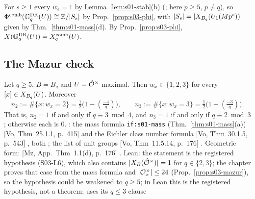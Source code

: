 For $s\ge1$ every $w_e=1$ by Lemma~\ref{lem:s01-stab}(b) (; here $p\ge5$, $p\ne q$), so
$\Phi^{\mathrm{comb}}(\mathbb{G}^{\mathrm{DR}}_q(U))\cong\mathbb{Z}/|S_s|$ by Prop.~\ref{prop:s03-phi}, with $|S_s|=|X_{B_q}(U_1(Mp^s))|$ given by Thm.~\ref{thm:s01-mass}(d). \stproved
By Prop.~\ref{prop:s03-phi}, $X(\mathbb{G}^{\mathrm{DR}}_q(U))=X^{\mathrm{comb}}_q(U)$.

\subsection{The Mazur check}

\begin{lemma}\label{lem:s03-elliptic}
Let $q\ge5$, $B=B_q$ and $U=\hat{\mathcal{O}}^\times$ maximal. Then $w_x\in\{1,2,3\}$ for every $[x]\in X_{B_q}(U)$. Moreover
\[n_2:=\#\{x:w_x=2\}=\tfrac12\big(1-(\tfrac{-4}q)\big),\qquad n_3:=\#\{x:w_x=3\}=\tfrac12\big(1-(\tfrac{-3}q)\big).\]
That is, $n_2=1$ if and only if $q\equiv3\bmod4$, and $n_3=1$ if and only if $q\equiv2\bmod3$; otherwise each is $0$.
\stpmc: the mass formula \texttt{if:s01-mass} (Thm.~\ref{thm:s01-mass}(a)) [Vo, Thm~25.1.1, p.~415]
 and the Eichler class number formula [Vo, Thm~30.1.5, p.~543]
, both \stcited; the list of unit groups [Vo, Thm~11.5.14, p.~176]
 \stcited.
Geometric form: [Mz, App.\ Thm~1.1(d), p.~176] .
Lean: the statement is the registered hypothesis  (S03-L6), which also contains $|X_B(\hat{\mathcal{O}}^\times)|=1$ for $q\in\{2,3\}$; the chapter proves that case from the mass formula and $|\mathcal{O}_x^\times|\le24$ (Prop.~\ref{prop:s03-mazur}), so the hypothesis could be weakened to $q\ge5$; in Lean this is the registered hypothesis, not a theorem;  uses its $q\le3$ clause
\end{lemma}
